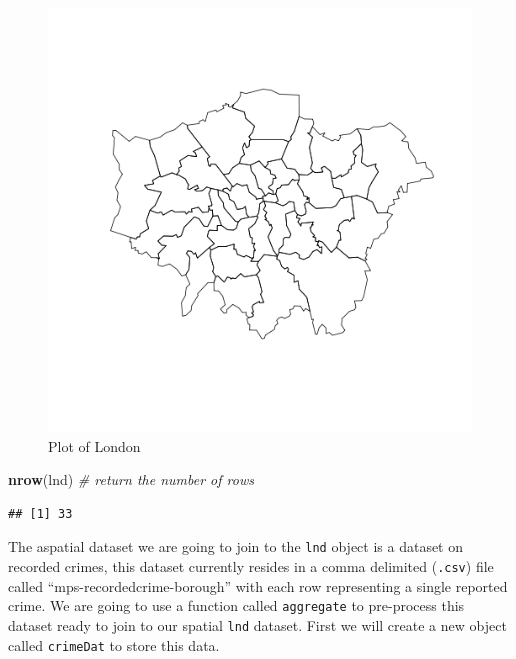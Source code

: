 \documentclass[]{article}
\newenvironment{Shaded}{}{}
\newcommand{\KeywordTok}[1]{\textcolor[rgb]{0.00,0.44,0.13}{\textbf{{#1}}}}
\newcommand{\CommentTok}[1]{\textcolor[rgb]{0.38,0.63,0.69}{\textit{{#1}}}}
\newcommand{\NormalTok}[1]{{#1}}
\begin{document}
\begin{figure}[htbp]
\centering
\includegraphics{figure/Plot_of_London.png}
\caption{Plot of London}
\end{figure}

\begin{Shaded}
\begin{Highlighting}[]
\KeywordTok{nrow}\NormalTok{(lnd)  }\CommentTok{# return the number of rows}
\end{Highlighting}
\end{Shaded}

\begin{verbatim}
## [1] 33
\end{verbatim}

The aspatial dataset we are going to join to the \texttt{lnd} object is
a dataset on recorded crimes, this dataset currently resides in a comma
delimited (\texttt{.csv}) file called ``mps-recordedcrime-borough'' with
each row representing a single reported crime. We are going to use a
function called \texttt{aggregate} to pre-process this dataset ready to
join to our spatial \texttt{lnd} dataset. First we will create a new
object called \texttt{crimeDat} to store this data.
\end{document}
